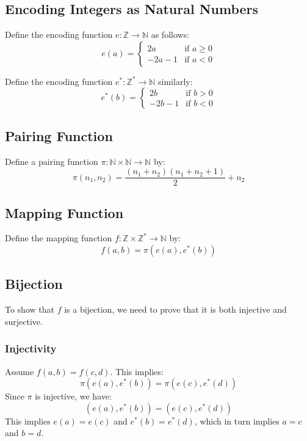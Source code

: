 \subsection*{Encoding Integers as Natural Numbers}

Define the encoding function \(e: \mathbb{Z} \to \mathbb{N}\) as follows:
\[
e(a) =
\begin{cases}
	2a & \text{if } a \geq 0 \\
	-2a - 1 & \text{if } a < 0
\end{cases}
\]

Define the encoding function \(e^*: \mathbb{Z}^* \to \mathbb{N}\) similarly:
\[
e^*(b) =
\begin{cases}
	2b & \text{if } b > 0 \\
	-2b - 1 & \text{if } b < 0
\end{cases}
\]

\subsection*{Pairing Function}

Define a pairing function \(\pi: \mathbb{N} \times \mathbb{N} \to \mathbb{N}\) by:
\[
\pi(n_1, n_2) = \frac{(n_1 + n_2)(n_1 + n_2 + 1)}{2} + n_2
\]

\subsection*{Mapping Function}

Define the mapping function \(f: \mathbb{Z} \times \mathbb{Z}^* \to \mathbb{N}\) by:
\[
f(a, b) = \pi(e(a), e^*(b))
\]

\subsection*{Bijection}

To show that \(f\) is a bijection, we need to prove that it is both injective and surjective.

\subsubsection*{Injectivity}

Assume \(f(a, b) = f(c, d)\). This implies:
\[
\pi(e(a), e^*(b)) = \pi(e(c), e^*(d))
\]
Since \(\pi\) is injective, we have:
\[
(e(a), e^*(b)) = (e(c), e^*(d))
\]
This implies \(e(a) = e(c)\) and \(e^*(b) = e^*(d)\), which in turn implies \(a = c\) and \(b = d\).

